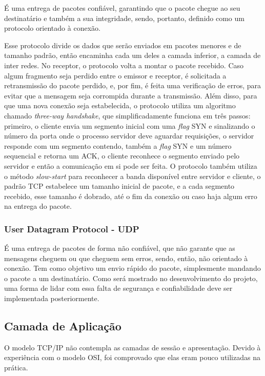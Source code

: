É uma entrega de pacotes confiável, garantindo que o pacote chegue ao seu destinatário e também a sua integridade, sendo, portanto, definido como um protocolo orientado à conexão.

Esse protocolo divide os dados que serão enviados em pacotes menores e de tamanho padrão, então encaminha cada um deles a camada inferior, a camada de inter redes. No receptor, o protocolo volta a montar o pacote recebido. Caso algum fragmento seja perdido entre o emissor e receptor, é solicitada a retransmissão do pacote perdido, e, por fim, é feita uma verificação de erros, para evitar que a mensagem seja corrompida durante a transmissão. Além disso, para que uma nova conexão seja estabelecida, o protocolo utiliza um algoritmo chamado \textit{three-way handshake}, que simplificadamente funciona em três passos: primeiro, o cliente envia um segmento inicial com uma \textit{flag} SYN e sinalizando o número da porta onde o processo servidor deve aguardar requisições, o servidor responde com um segmento contendo, também a \textit{flag} SYN e um número sequencial e retorna um ACK, o cliente reconhece o segmento enviado pelo servidor e então a comunicação em si pode ser feita. O protocolo também utiliza o método \textit{slow-start} para reconhecer a banda disponível entre servidor e cliente, o padrão TCP estabelece um tamanho inicial de pacote, e a cada segmento recebido, esse tamanho é dobrado, até o fim da conexão ou caso haja algum erro na entrega do pacote.

\subsubsection{User Datagram Protocol - UDP}

É uma entrega de pacotes de forma não confiável, que não garante que as mensagens cheguem ou que cheguem sem erros, sendo, então, não orientado à conexão. Tem como objetivo um envio rápido do pacote, simplesmente mandando o pacote a um destinatário. Como será mostrado no desenvolvimento do projeto, uma forma de lidar com essa falta de segurança e confiabilidade deve ser implementada posteriormente.

\subsection{Camada de Aplicação}

O modelo TCP/IP não contempla as camadas de sessão e apresentação. Devido à experiência com o modelo OSI, foi comprovado que elas eram pouco utilizadas na prática.

